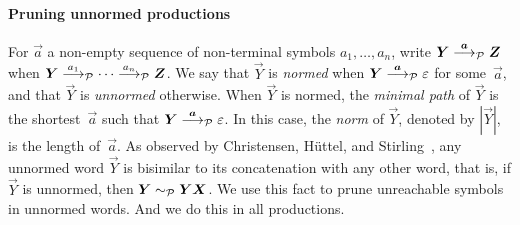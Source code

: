 \paragraph{Pruning unnormed productions}

For $\vec a$ a non-empty sequence of non-terminal symbols
$a_1,\dots, a_n$, write $\vec Y \LTSderivesP[\vec a] \vec Z$
when $\vec Y \LTSderivesP[a_1] \cdots \LTSderivesP[a_n] \vec Z$.
%
We say that $\vec Y$ is \emph{normed} when
$\vec Y \LTSderivesP[\vec a] \varepsilon$ for some~$\vec a$, and that
$\vec Y$ is \emph{unnormed} otherwise.
%
When $\vec Y$ is normed, the \emph{minimal path} of $\vec Y$ is the
shortest~$\vec a$ such that $\vec Y \LTSderivesP[\vec a]
\varepsilon$.
%
In this case, the \emph{norm} of $\vec Y$, denoted by $|\vec Y|$, is
the length of~$\vec a$.
%
%
As observed by Christensen, H\"uttel, and
Stirling~\cite{DBLP:journals/iandc/ChristensenHS95}, any unnormed word
$\vec Y$ is bisimilar to its concatenation with any other word, that
is, if $\vec Y$ is unnormed, then $\vec Y \ProdEquiv \vec Y \vec X$.
We use this fact to prune unreachable symbols in unnormed words. And
we do this in all productions.




